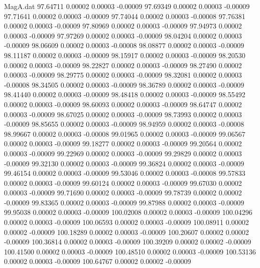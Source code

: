 \begin{filecontents}{MagA.dat}
  97.64711    0.00002    0.00003   -0.00009
  97.69349    0.00002    0.00003   -0.00009
  97.71641    0.00002    0.00003   -0.00009
  97.74044    0.00002    0.00003   -0.00008
  97.76381    0.00002    0.00003   -0.00009
  97.80969    0.00002    0.00003   -0.00009
  97.94973    0.00002    0.00003   -0.00009
  97.97269    0.00002    0.00003   -0.00009
  98.04204    0.00002    0.00003   -0.00009
  98.06609    0.00002    0.00003   -0.00008
  98.08877    0.00002    0.00003   -0.00009
  98.11187    0.00002    0.00003   -0.00009
  98.15917    0.00002    0.00003   -0.00009
  98.20530    0.00002    0.00003   -0.00009
  98.22827    0.00002    0.00003   -0.00009
  98.27490    0.00002    0.00003   -0.00009
  98.29775    0.00002    0.00003   -0.00009
  98.32081    0.00002    0.00003   -0.00008
  98.34505    0.00002    0.00003   -0.00009
  98.36789    0.00002    0.00003   -0.00009
  98.41440    0.00002    0.00003   -0.00009
  98.48418    0.00002    0.00003   -0.00009
  98.55492    0.00002    0.00003   -0.00009
  98.60093    0.00002    0.00003   -0.00009
  98.64747    0.00002    0.00003   -0.00009
  98.67025    0.00002    0.00003   -0.00009
  98.73993    0.00002    0.00003   -0.00009
  98.85655    0.00002    0.00003   -0.00009
  98.94959    0.00002    0.00003   -0.00008
  98.99667    0.00002    0.00003   -0.00008
  99.01965    0.00002    0.00003   -0.00009
  99.06567    0.00002    0.00003   -0.00009
  99.18277    0.00002    0.00003   -0.00009
  99.20564    0.00002    0.00003   -0.00009
  99.22969    0.00002    0.00003   -0.00009
  99.29829    0.00002    0.00003   -0.00009
  99.32130    0.00002    0.00003   -0.00009
  99.36824    0.00002    0.00003   -0.00009
  99.46154    0.00002    0.00003   -0.00009
  99.53046    0.00002    0.00003   -0.00008
  99.57833    0.00002    0.00003   -0.00009
  99.60124    0.00002    0.00003   -0.00009
  99.67030    0.00002    0.00003   -0.00009
  99.71690    0.00002    0.00003   -0.00009
  99.78739    0.00002    0.00002   -0.00009
  99.83365    0.00002    0.00003   -0.00009
  99.87988    0.00002    0.00003   -0.00009
  99.95038    0.00002    0.00003   -0.00009
 100.02008    0.00002    0.00003   -0.00009
 100.04296    0.00002    0.00003   -0.00009
 100.06593    0.00002    0.00003   -0.00009
 100.08911    0.00002    0.00002   -0.00009
 100.18289    0.00002    0.00003   -0.00009
 100.20607    0.00002    0.00002   -0.00009
 100.36814    0.00002    0.00003   -0.00009
 100.39209    0.00002    0.00002   -0.00009
 100.41500    0.00002    0.00003   -0.00009
 100.48510    0.00002    0.00003   -0.00009
 100.53136    0.00002    0.00003   -0.00009
 100.64767    0.00002    0.00002   -0.00009

\end{filecontents}

